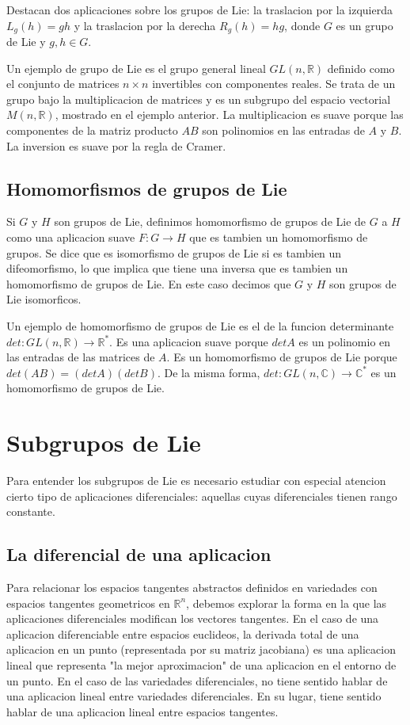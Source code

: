 \documentclass[12pt]{extarticle}
\newcommand{\R}{\mathbb{R}}
\newcommand{\C}{\mathbb{C}}
\newcommand{\<}{\langle}
\renewcommand{\>}{\rangle}
\theoremstyle{definition}
\begin{document}
Destacan dos aplicaciones sobre los grupos de Lie: la traslacion por la
izquierda $L_g(h) = gh$ y la traslacion por la derecha $R_g(h)=hg$, donde $G$ es
un grupo de Lie y $g, h \in G$.

Un ejemplo de grupo de Lie es el grupo general lineal $GL(n, \R)$ definido como
el conjunto de matrices $n \times n$ invertibles con componentes reales. Se
trata de un grupo bajo la multiplicacion de matrices y es un subgrupo del
espacio vectorial $M(n, \R)$, mostrado en el ejemplo anterior. La multiplicacion
es suave porque las componentes de la matriz producto $AB$ son polinomios en las
entradas de $A$ y $B$. La inversion es suave por la regla de Cramer.

\subsection{Homomorfismos de grupos de Lie}
Si $G$ y $H$ son grupos de Lie, definimos homomorfismo de grupos de Lie de $G$ a
$H$ como una aplicacion suave $F: G \rightarrow H$ que es tambien un
homomorfismo de grupos. Se dice que es isomorfismo de grupos de Lie si es
tambien un difeomorfismo, lo que implica que tiene una inversa que es tambien un
homomorfismo de grupos de Lie. En este caso decimos que $G$ y $H$ son grupos de
Lie isomorficos.

Un ejemplo de homomorfismo de grupos de Lie es el de la funcion determinante
$det: GL(n,\R) \rightarrow \R^*$. Es una aplicacion suave porque $det A$ es un
polinomio en las entradas de las matrices de $A$. Es un homomorfismo de grupos
de Lie porque $det(AB) = (det A)(det B)$. De la misma forma, $det: GL(n, \C)
\rightarrow \C^*$ es un homomorfismo de grupos de Lie.

\section{Subgrupos de Lie}
Para entender los subgrupos de Lie es necesario estudiar con especial atencion
cierto tipo de aplicaciones diferenciales: aquellas cuyas diferenciales tienen
rango constante.

\subsection{La diferencial de una aplicacion}
Para relacionar los espacios tangentes abstractos definidos en variedades con
espacios tangentes geometricos en $\R^n$, debemos explorar la forma en la que
las aplicaciones diferenciales modifican los vectores tangentes. En el caso de
una aplicacion diferenciable entre espacios euclideos, la derivada total de una
aplicacion en un punto (representada por su matriz jacobiana) es una aplicacion
lineal que representa "la mejor aproximacion" de una aplicacion en el entorno de
un punto. En el caso de las variedades diferenciales, no tiene sentido hablar de
una aplicacion lineal entre
variedades diferenciales. En su lugar, tiene sentido hablar de una aplicacion
lineal entre espacios tangentes.
\end{document}
